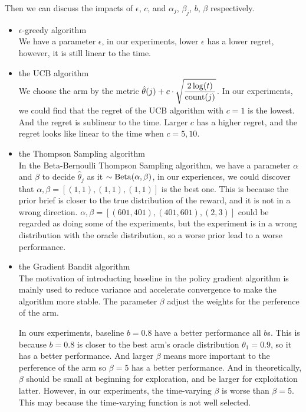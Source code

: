 Then we can discuss the impacts of $\epsilon$, $c$, and $\alpha_{j}$, $\beta_{j}$, $b$, $\beta$ respectively.
\begin{itemize}
\item $\epsilon$-greedy algorithm \\
We have a parameter $\epsilon$, in our experiments, lower $\epsilon$ has a lower regret, however, it is still linear to the time.

\item the UCB algorithm \\
We choose the arm by the metric $\hat{\theta}(j)+c\cdot \sqrt{\dfrac{2\log(t)}{\text{count}(j)}}$. In our experiments, we could find that the regret of the UCB algorithm with $c=1$ is the lowest. And the regret is sublinear to the time. Larger $c$ has a higher regret, and the regret looks like linear to the time when $c=5,10$.

\item the Thompson Sampling algorithm \\
In the Beta-Bernoulli Thompson Sampling algorithm, we have a parameter $\alpha$ and $\beta$ to decide $\hat{\theta}_j$ as it $\sim \operatorname{Beta}(\alpha,\beta)$, in our experiences, we could discover that $\alpha,\beta=[(1,1),(1,1),(1,1)]$ is the best one. This is because the prior brief is closer to the true distribution of the reward, and it is not in a wrong direction. $\alpha,\beta=[(601,401),(401,601),(2,3)]$ could be regarded as doing some of the experiments, but the experiment is in a wrong distribution with the oracle distribution, so a worse prior lead to a worse performance.

\item the Gradient Bandit algorithm \\
The motivation of introducting baseline in the policy gradient algorithm is mainly used to reduce variance and accelerate convergence to make the algorithm more stable. The parameter $\beta$ adjust the weights for the perference of the arm.

In ours experiments, baseline $b=0.8$ have a better performance all $b$s. This is because $b=0.8$ is closer to the best arm's oracle distribution $\theta_1=0.9$, so it has a better performance. And larger $\beta$ means more important to the perference of the arm so $\beta=5$ has a better performance. And in theoretically, $\beta$ should be small at beginning for exploration, and be larger for exploitation latter. However, in our experiments, the time-varying $\beta$ is worse than $\beta=5$. This may because the time-varying function is not well selected.
\end{itemize}

